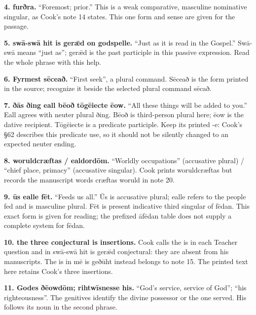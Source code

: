 \textbf{4. furðra.} “Foremost; prior.” This is a weak comparative, masculine nominative singular, as Cook’s note 14 states. This one form and sense are given for the passage.

\textbf{5. swā-swā hit is gerǣd on godspelle.} “Just as it is read in the Gospel.” Swā-swā means “just as”; gerǣd is the past participle in this passive expression. Read the whole phrase with this help.

\textbf{6. Fyrmest sēceað.} “First seek”, a plural command. Sēceað is the form printed in the source; recognize it beside the selected plural command sēcað.

\textbf{7. ðās ðing eall bēoð tōgēiecte ēow.} “All these things will be added to you.” Eall agrees with neuter plural ðing. Bēoð is third-person plural here; ēow is the dative recipient. Tōgēiecte is a predicate participle. Keep its printed -e: Cook’s §62 describes this predicate use, so it should not be silently changed to an expected neuter ending.

\textbf{8. woruldcræftas /\allowbreak{} ealdordōm.} “Worldly occupations” (accusative plural) /\allowbreak{} “chief place, primacy” (accusative singular). Cook prints woruldcræftas but records the manuscript words cræftas woruld in note 20.

\textbf{9. ūs ealle fēt.} “Feeds us all.” Ūs is accusative plural; ealle refers to the people fed and is masculine plural. Fēt is present indicative third singular of fēdan. This exact form is given for reading; the prefixed āfēdan table does not supply a complete system for fēdan.

\textbf{10. the three conjectural is insertions.} Cook calls the is in each Teacher question and in swā-swā hit is gerǣd conjectural: they are absent from his manuscripts. The is in mē is geðūht instead belongs to note 15. The printed text here retains Cook’s three insertions.

\textbf{11. Godes ðēowdōm; rihtwīsnesse his.} “God’s service, service of God”; “his righteousness”. The genitives identify the divine possessor or the one served. His follows its noun in the second phrase.

